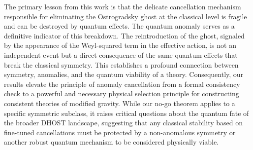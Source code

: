 \documentclass[twocolumn]{aastex631}
\begin{document}
The primary lesson from this work is that the delicate cancellation mechanism responsible for eliminating the Ostrogradsky ghost at the classical level is fragile and can be destroyed by quantum effects. The quantum anomaly serves as a definitive indicator of this breakdown. The reintroduction of the ghost, signaled by the appearance of the Weyl-squared term in the effective action, is not an independent event but a direct consequence of the same quantum effects that break the classical symmetry. This establishes a profound connection between symmetry, anomalies, and the quantum viability of a theory. Consequently, our results elevate the principle of anomaly cancellation from a formal consistency check to a powerful and necessary physical selection principle for constructing consistent theories of modified gravity. While our no-go theorem applies to a specific symmetric subclass, it raises critical questions about the quantum fate of the broader DHOST landscape, suggesting that any classical stability based on fine-tuned cancellations must be protected by a non-anomalous symmetry or another robust quantum mechanism to be considered physically viable.

{}

\end{document}
